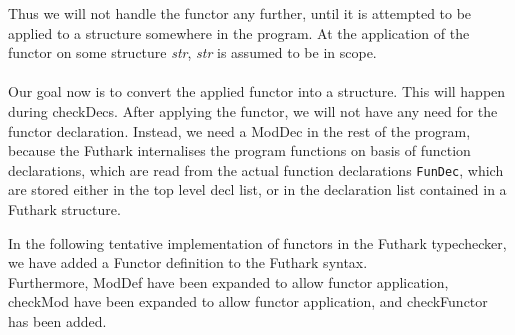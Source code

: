 Thus we will not handle the functor any further, until it is attempted to be
applied to a structure somewhere in the program. At the application of the
functor on some structure \textit{str}, \textit{str} is assumed to be in scope.
\\\\
Our goal now is to convert the applied functor into a structure. This will
happen during checkDecs.
After applying the functor, we will not have any need
for the functor declaration.
Instead, we need a ModDec in the rest of the program, because the Futhark
internalises the program functions on basis of function declarations, which are
read from the actual function declarations \texttt{FunDec}, which are stored
either in the top level decl list, or in the declaration list contained in a
Futhark structure.

In the following tentative implementation of functors in the Futhark
typechecker, we have added a Functor definition to the Futhark syntax.\\
Furthermore, ModDef have been expanded to allow functor application, checkMod
have been expanded to allow functor application, and checkFunctor has been added.

